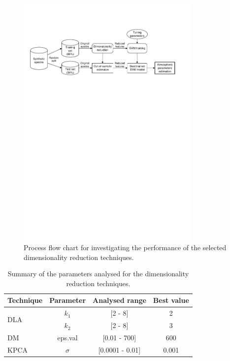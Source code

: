 \documentclass[a4paper,fleqn,usenatbib]{mnras}
\begin{document}
{{{\begin{figure}
\centering\includegraphics[width=0.8\textwidth]{flowchart.pdf}
\caption{Process flow chart for investigating the performance of the 
selected dimensionality reduction techniques.}
\label{fig:flowchart}
\end{figure}

\begin{table}
\centering
\caption{Summary of the parameters analysed for the 
dimensionality reduction techniques.}
\label{tab:parameters}
\begin{tabular}{l c c c}
\hline
\textbf{Technique} & \textbf{Parameter} & \textbf{Analysed range} & \textbf{Best value} \\
\hline
\multirow{2}{*}{DLA} 
	& $k_1$ & [2 - 8]  & 2 \\\cline{2-4}
	& $k_2$ & [2 - 8]  & 3 \\\hline
DM & eps.val & [0.01 - 700] & 600 \\\hline
KPCA & $\sigma$ & [0.0001 - 0.01] & 0.001 \\
\hline
\end{tabular}
\end{table}

}}}
\end{document}

